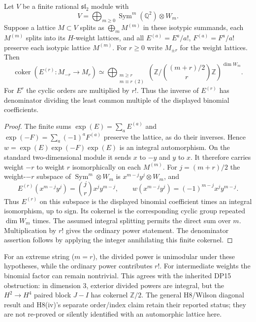 \begin{proposition}
Let $V$ be a finite rational $\mathfrak{sl}_2$ module with
\[
 V=\bigoplus_{m\ge0}
       \operatorname{Sym}^m(\mathbb Q^2)\otimes W_m.
\]
Suppose a lattice $M\subset V$ splits as
$\bigoplus_m M^{(m)}$ in these isotypic summands, each
$M^{(m)}$ splits into its $H$-weight lattices, and all
$E^{(a)}=E^a/a!$, $F^{(a)}=F^a/a!$ preserve each
isotypic lattice $M^{(m)}$.
For $r\ge0$ write $M_{\pm r}$ for the weight lattices.
Then
\begin{equation}\label{ag:integral-lefschetz-test}
 \operatorname{coker}
  (E^{(r)}:M_{-r}\longrightarrow M_r)
 \simeq
 \bigoplus_{\substack{m\ge r\\m\equiv r\ (2)}}
 \left(\mathbb Z/
     \binom{(m+r)/2}{r}\mathbb Z\right)^{\dim W_m}.
\end{equation}
For $E^r$ the cyclic orders are multiplied by $r!$.
Thus the inverse of $E^{(r)}$ has denominator dividing the
least common multiple of the displayed binomial coefficients.
\end{proposition}
\begin{proof}
The finite sums $\exp(E)=\sum_aE^{(a)}$ and
$\exp(-F)=\sum_a(-1)^aF^{(a)}$ preserve the lattice,
as do their inverses. Hence
$w=\exp(E)\exp(-F)\exp(E)$ is an integral automorphism.
On the standard two-dimensional module it sends $x$ to $-y$
and $y$ to $x$. It therefore carries weight $-r$ to weight
$r$ isomorphically on each $M^{(m)}$.
For $j=(m+r)/2$ the weight-$-r$ subspace of
$\operatorname{Sym}^m\otimes W_m$ is
$x^{m-j}y^j\otimes W_m$, and
\[
 E^{(r)}(x^{m-j}y^j)
   =\binom{j}{r}x^jy^{m-j},\qquad
 w(x^{m-j}y^j)=(-1)^{m-j}x^jy^{m-j}.
\]
Thus $E^{(r)}$ on this subspace is the displayed binomial
coefficient times an integral isomorphism, up to sign.
Its cokernel is the corresponding cyclic group repeated
$\dim W_m$ times. The assumed integral splitting permits the
direct sum over $m$. Multiplication by $r!$ gives the ordinary
power statement. The denominator assertion follows by applying
the integer annihilating this finite cokernel.
\end{proof}

For an extreme string ($m=r$), the divided power is unimodular
under these hypotheses, while the ordinary power contributes
$r!$. For intermediate weights the binomial factor can remain
nontrivial. This agrees with the inherited DP15 obstruction:
in dimension $3$, exterior divided powers are integral, but
the $H^2\to H^4$ paired block $J-I$ has cokernel
$\mathbb Z/2$. The general H8/Wilson diagonal result and
H8(iv)'s separate order/index claim retain their reported
status; they are not re-proved or silently identified with an
automorphic lattice here.

